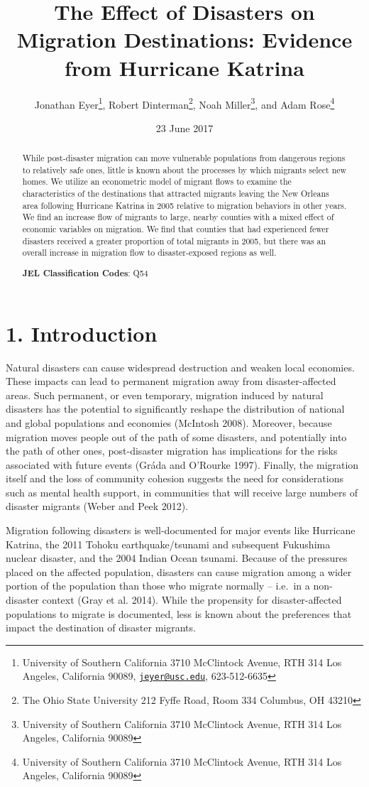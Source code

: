 \documentclass[]{article}
\title{The Effect of Disasters on Migration Destinations: Evidence from
Hurricane Katrina}
\author{Jonathan Eyer\footnote{University of Southern California 3710 McClintock
  Avenue, RTH 314 Los Angeles, California 90089,
  \href{mailto:jeyer@usc.edu}{\nolinkurl{jeyer@usc.edu}}, 623-512-6635},
Robert Dinterman\footnote{The Ohio State University 212 Fyffe Road, Room
  334 Columbus, OH 43210}, Noah Miller\footnote{University of Southern
  California 3710 McClintock Avenue, RTH 314 Los Angeles, California
  90089}, and Adam Rose\footnote{University of Southern California 3710
  McClintock Avenue, RTH 314 Los Angeles, California 90089}}
\date{23 June 2017}
\begin{document}
\maketitle

\begin{abstract}
\noindent While post-disaster migration can move vulnerable populations from
dangerous regions to relatively safe ones, little is known about the
processes by which migrants select new homes. We utilize an econometric
model of migrant flows to examine the characteristics of the
destinations that attracted migrants leaving the New Orleans area
following Hurricane Katrina in 2005 relative to migration behaviors in
other years. We find an increase flow of migrants to large, nearby
counties with a mixed effect of economic variables on migration. We find
that counties that had experienced fewer disasters received a greater
proportion of total migrants in 2005, but there was an overall increase
in migration flow to disaster-exposed regions as well.
\vspace{.5cm}

\noindent \textbf{JEL Classification Codes}: Q54
\end{abstract}
\newpage


\newpage

\section{1. Introduction}\label{introduction}


Natural disasters can cause widespread destruction and weaken local
economies. These impacts can lead to permanent migration away from
disaster-affected areas. Such permanent, or even temporary, migration
induced by natural disasters has the potential to significantly reshape
the distribution of national and global populations and economies
(McIntosh 2008). Moreover, because migration moves people out of the
path of some disasters, and potentially into the path of other ones,
post-disaster migration has implications for the risks associated with
future events (Gráda and O'Rourke 1997). Finally, the migration itself
and the loss of community cohesion suggests the need for considerations
such as mental health support, in communities that will receive large
numbers of disaster migrants (Weber and Peek 2012).

Migration following disasters is well-documented for major events like
Hurricane Katrina, the 2011 Tohoku earthquake/tsunami and subsequent
Fukushima nuclear disaster, and the 2004 Indian Ocean tsunami. Because
of the pressures placed on the affected population, disasters can cause
migration among a wider portion of the population than those who migrate
normally -- i.e.~in a non-disaster context (Gray et al. 2014). While the
propensity for disaster-affected populations to migrate is documented,
less is known about the preferences that impact the destination of
disaster migrants.
\end{document}
